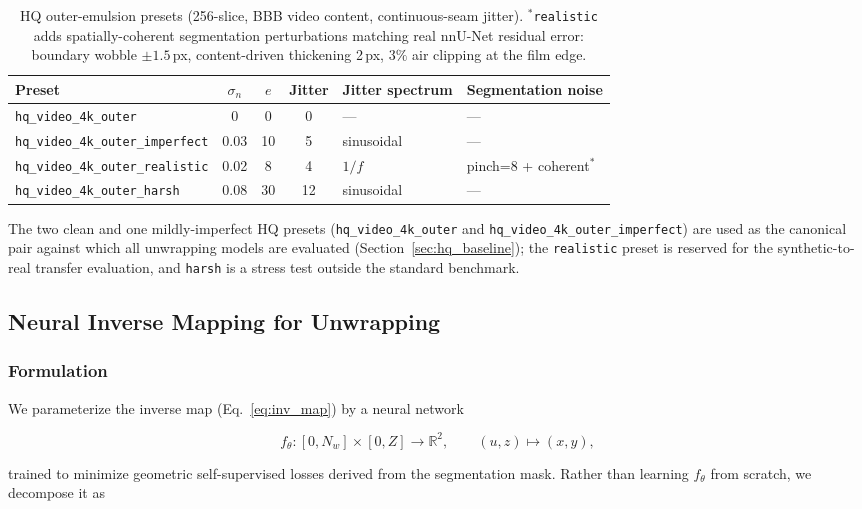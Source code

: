 \documentclass[11pt,a4paper]{article}
\newcommand{\R}{\mathbb{R}}
\begin{document}
\begin{table}[H]
\centering
\small
\begin{tabular}{lcccll}
\toprule
Preset & $\sigma_n$ & $e$ & Jitter & Jitter spectrum & Segmentation noise \\
\midrule
\texttt{hq\_video\_4k\_outer}            & 0    & 0  & 0  & ---        & --- \\
\texttt{hq\_video\_4k\_outer\_imperfect} & 0.03 & 10 & 5  & sinusoidal & --- \\
\texttt{hq\_video\_4k\_outer\_realistic} & 0.02 & 8  & 4  & $1/f$      & pinch=8 + coherent$^*$ \\
\texttt{hq\_video\_4k\_outer\_harsh}     & 0.08 & 30 & 12 & sinusoidal & --- \\
\bottomrule
\end{tabular}
\caption{HQ outer-emulsion presets (256-slice, BBB video content, continuous-seam jitter). $^*$\texttt{realistic} adds spatially-coherent segmentation perturbations matching real nnU-Net residual error: boundary wobble $\pm 1.5$\,px, content-driven thickening 2\,px, $3\%$ air clipping at the film edge.}
\label{tab:hq_outer_presets}
\end{table}

The two clean and one mildly-imperfect HQ presets (\texttt{hq\_video\_4k\_outer} and \texttt{hq\_video\_4k\_outer\_imperfect}) are used as the canonical pair against which all unwrapping models are evaluated (Section~\ref{sec:hq_baseline}); the \texttt{realistic} preset is reserved for the synthetic-to-real transfer evaluation, and \texttt{harsh} is a stress test outside the standard benchmark.

\subsection{Neural Inverse Mapping for Unwrapping}
\label{sec:neural}

\subsubsection{Formulation}

We parameterize the inverse map (Eq.~\eqref{eq:inv_map}) by a neural network

\begin{equation}
    f_\theta : [0, N_w] \times [0, Z] \to \R^2, \qquad (u, z) \mapsto (x, y),
\end{equation}

trained to minimize geometric self-supervised losses derived from the segmentation mask. Rather than learning $f_\theta$ from scratch, we decompose it as
\end{document}
